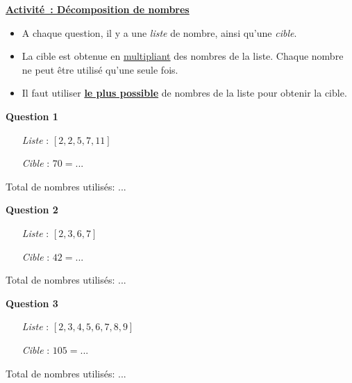 \documentclass[a4paper,12pt]{article}
\title{}
\date{14 septembre 2021}
\begin{document}
\noindent\textbf{\huge \uline{Activité : Décomposition de nombres}}
\vspace{1em}

\makeatletter
\@date
\makeatother
\strut\newline

\begin{greybox}[frametitle={Consignes}]
	\begin{itemize}
		\item A chaque question, il y a une \textit{liste} de nombre, ainsi qu'une \textit{cible}.
		\item La cible est obtenue en \uline{multipliant} des nombres de la liste. Chaque nombre ne peut être utilisé qu'une seule fois.
		\item Il faut utiliser \uline{\textbf{le plus possible}} de nombres de la liste pour obtenir la cible.
	\end{itemize}
\end{greybox}

\textbf{Question 1} \\
\begin{itemize}
	\setlength\itemsep{0.3em}
	\item[\textit{Liste}]: $[2, 2, 5, 7, 11]$
	\item[\textit{Cible}]: $70 = ...$
\end{itemize}
\vspace{0.2cm}
Total de nombres utilisés: ...
\vspace{0.8cm}

\textbf{Question 2} \\
\begin{itemize}
	\setlength\itemsep{0.3em}
	\item[\textit{Liste}]: $[2, 3, 6, 7]$
	\item[\textit{Cible}]: $42 = ...$
\end{itemize}
\vspace{0.2cm}
Total de nombres utilisés: ...
\vspace{0.8cm}

\textbf{Question 3} \\
\begin{itemize}
	\setlength\itemsep{0.3em}
	\item[\textit{Liste}]: $[2, 3, 4, 5, 6, 7, 8, 9]$
	\item[\textit{Cible}]: $105 = ...$
\end{itemize}
\vspace{0.2cm}
Total de nombres utilisés: ...
\vspace{0.8cm}
\end{document}

